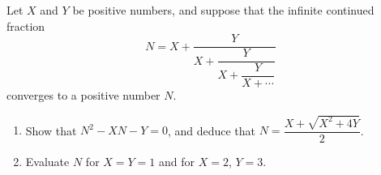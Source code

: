 Let $X$ and $Y$ be positive numbers, and suppose that the infinite continued fraction
\[N=X+\dfrac{Y}{X+\dfrac{Y}{X+\dfrac{Y}{X+\cdots}}}\]
converges to a positive number $N$.
\begin{enumerate}
\item[(a)] Show that $N^2-XN-Y=0$, and deduce that $N=\dfrac{X+\sqrt{X^2+4Y}}{2}$.
\item[(b)] Evaluate $N$ for $X=Y=1$ and for $X=2$, $Y=3$.
\end{enumerate}

